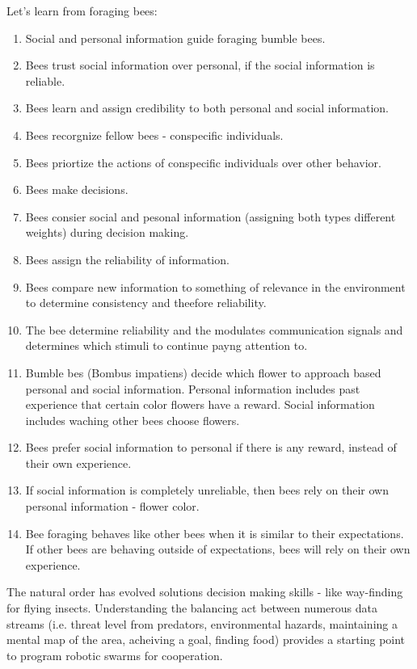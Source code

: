 \documentclass[a4paper,11pt]{article}
\begin{document}
Let's learn from foraging bees: \cite{dunlap2016foraging}
\begin{enumerate}
\item Social and personal information guide foraging bumble bees. 
\item Bees trust social information over personal, if the social information is reliable. 
\item Bees learn and assign credibility to both personal and social information.
\item Bees recorgnize fellow bees - conspecific individuals. 
\item Bees priortize the actions of conspecific individuals over other behavior. 
\item Bees make decisions. 
\item Bees consier social and pesonal information (assigning both types different weights) during decision making. 
\item Bees assign the reliability of information. 
\item Bees compare new information to something of relevance in the environment to determine consistency and theefore reliability. 
\item The bee determine reliability and the modulates communication signals and determines which stimuli to continue payng attention to. 
\item Bumble bes (Bombus impatiens) decide which flower to approach based personal and social information. Personal information includes past experience that certain color flowers have a reward. Social information includes waching other bees choose flowers. 
\item Bees prefer social information to personal if there is any reward, instead of their own experience. 
\item If social information is completely unreliable, then bees rely on their own personal information - flower color.  
\item Bee foraging behaves like other bees when it is similar to their expectations. If other bees are behaving outside of expectations, bees will rely on their own experience. 
\end{enumerate}




The natural order has evolved solutions decision making skills - like way-finding for flying insects. Understanding the balancing act between numerous data streams (i.e. threat level from predators, environmental hazards, maintaining a mental map of the area, acheiving a goal, finding food) provides a starting point to program robotic swarms for cooperation. 
\end{document}
